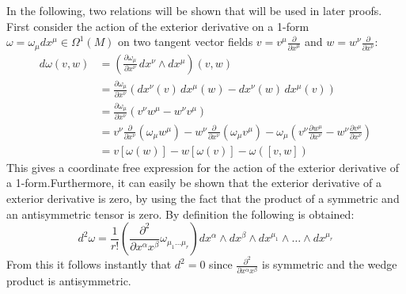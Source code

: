 In the following, two relations will be shown that will be used in later proofs\cite{NakaharaGeometrytopologyphysics2005}. First consider the action of the exterior derivative on a 1-form $\omega=\omega_\mu dx^\mu \in \Omega^1(M)$ on two tangent vector fields $v=v^\mu\frac{\partial}{\partial x^\mu}$ and $w=w^\nu\frac{\partial}{\partial x^\nu}$:
\begin{align*}
  d\omega(v, w) 
  &= \left( \frac{\partial \omega_\mu}{\partial x^\nu} \, dx^\nu \wedge dx^\mu \right)(v, w) \\
  &= \frac{\partial \omega_\mu}{\partial x^\nu} 
  \left( dx^\nu(v) \, dx^\mu(w) - dx^\nu(w) \, dx^\mu(v) \right) \\
  &= \frac{\partial \omega_\mu}{\partial x^\nu} 
  \left( v^\nu w^\mu - w^\nu v^\mu \right) \\
  &= v^\nu \frac{\partial}{\partial x^\nu} \left( \omega_\mu w^\mu \right)
  - w^\nu \frac{\partial}{\partial x^\nu} \left( \omega_\mu v^\mu \right)
  - \omega_\mu \left( v^\nu \frac{\partial w^\mu}{\partial x^\nu} - w^\nu \frac{\partial v^\mu}{\partial x^\nu} \right) \\
  &= v[\omega(w)] - w[\omega(v)] - \omega([v, w])
\end{align*}
This gives a coordinate free expression for the action of the exterior derivative of a 1-form.Furthermore, it can easily be shown that the exterior derivative of a exterior derivative is zero, by using the fact that the product of a symmetric and an antisymmetric tensor is zero. By definition the following is obtained:
\[ d^2\omega = \frac{1}{r!}\left( \frac{\partial^2}{ \partial x^\alpha x^\beta} \omega_{\mu_1 \dots \mu_r} \right) dx^\alpha \wedge dx^\beta \wedge dx^{\mu_1} \wedge \dots \wedge dx^{\mu_r} \]
From this it follows instantly that $d^2=0$ since $\frac{\partial^2}{ \partial x^\alpha x^\beta}$ is symmetric and the wedge product is antisymmetric.
